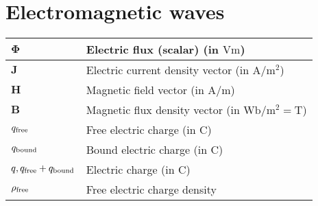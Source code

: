 \documentclass{article}
\begin{document}
\section{Electromagnetic waves}
\begin{xltabular}{\textwidth}{XX}
	\(\mathbf{\Phi}\)                                            & Electric flux (scalar) (in \(\si{\volt\meter}\))                                                                                                                                         \\ \hline
	\(\mathbf{J}\)                                               & Electric current density vector (in \(\si{\ampere\per\square\meter}\))                                                                                                                   \\ \hline
	\(\mathbf{H}\)                                               & Magnetic field vector (in \(\si{\ampere\per\meter}\))                                                                                                                                    \\ \hline
	\(\mathbf{B}\)                                               & Magnetic flux density vector (in \(\si{\weber\per\meter\squared} = \si{\tesla}\))                                                                                                        \\ \hline
	\(q_{\textnormal{free}}\)                                    & Free electric charge (in \(\si{\coulomb}\))                                                                                                                                              \\ \hline
	\(q_{\textnormal{bound}}\)                                   & Bound electric charge (in \(\si{\coulomb}\))                                                                                                                                             \\ \hline
	\(q, q_{\textnormal{free}}+q_{\textnormal{bound}}\)          & Electric charge (in \(\si{\coulomb}\))                                                                                                                                                   \\ \hline
	\(\rho_{\textnormal{free}}\)                                 & Free electric charge density                                                                                                                                                             \\ \hline

\end{xltabular}
\end{document}
